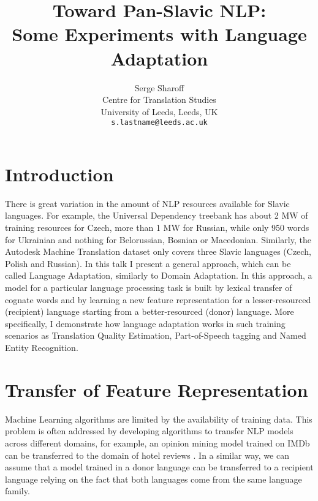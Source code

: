 \documentclass[11pt]{article}
\title{Toward Pan-Slavic NLP: \\
  Some Experiments with Language Adaptation}
\author{Serge Sharoff\\
  Centre for Translation Studies\\
  University of Leeds, Leeds, UK\\
  {\tt s.lastname@leeds.ac.uk} \\}
\date{}
\begin{document}
\maketitle

\section{Introduction}

There is great variation in the amount of NLP resources available for
Slavic languages. For example, the Universal Dependency treebank
\cite{nivre16} has about 2 MW of training resources for Czech, more
than 1 MW for Russian, while only 950 words for Ukrainian and nothing
for Belorussian, Bosnian or Macedonian. Similarly, the Autodesk
Machine Translation dataset only covers three Slavic languages (Czech,
Polish and Russian).  In this talk I present a general approach, which
can be called Language Adaptation, similarly to Domain Adaptation.  In
this approach, a model for a particular language processing task is
built by lexical transfer of cognate words and by learning a new
feature representation for a lesser-resourced (recipient) language
starting from a better-resourced (donor) language. More specifically,
I demonstrate how language adaptation works in such training scenarios
as Translation Quality Estimation, Part-of-Speech tagging and Named
Entity Recognition.

\section{Transfer of Feature Representation}
Machine Learning algorithms are limited by the availability of training data.  This problem is often addressed by developing algorithms to transfer NLP models across different domains, for example, an opinion mining model trained on IMDb can be transferred to the domain of hotel reviews \cite{sogaard13}.  In a similar way, we can assume that a model trained in a donor language can be transferred to a recipient language relying on the fact that both languages come from the same language family. 
\end{document}
